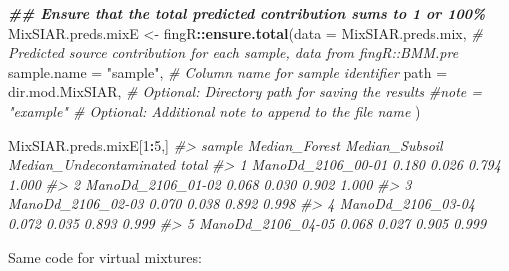 \documentclass[
]{article}
\newenvironment{Shaded}{\begin{snugshade}}{\end{snugshade}}
\newcommand{\AttributeTok}[1]{\textcolor[rgb]{0.13,0.29,0.53}{#1}}
\newcommand{\CommentTok}[1]{\textcolor[rgb]{0.56,0.35,0.01}{\textit{#1}}}
\newcommand{\DecValTok}[1]{\textcolor[rgb]{0.00,0.00,0.81}{#1}}
\newcommand{\DocumentationTok}[1]{\textcolor[rgb]{0.56,0.35,0.01}{\textbf{\textit{#1}}}}
\newcommand{\FunctionTok}[1]{\textcolor[rgb]{0.13,0.29,0.53}{\textbf{#1}}}
\newcommand{\NormalTok}[1]{#1}
\newcommand{\OtherTok}[1]{\textcolor[rgb]{0.56,0.35,0.01}{#1}}
\newcommand{\SpecialCharTok}[1]{\textcolor[rgb]{0.81,0.36,0.00}{\textbf{#1}}}
\newcommand{\StringTok}[1]{\textcolor[rgb]{0.31,0.60,0.02}{#1}}
\begin{document}
\begin{Shaded}
\begin{Highlighting}[]
\DocumentationTok{\#\# Ensure that the total predicted contribution sums to 1 or 100\%}
\NormalTok{MixSIAR.preds.mixE }\OtherTok{\textless{}{-}}\NormalTok{ fingR}\SpecialCharTok{::}\FunctionTok{ensure.total}\NormalTok{(}\AttributeTok{data =}\NormalTok{ MixSIAR.preds.mix,                  }\CommentTok{\# Predicted source contribution for each sample, data from fingR::BMM.pre}
                                          \AttributeTok{sample.name =} \StringTok{"sample"}\NormalTok{,                    }\CommentTok{\# Column name for sample identifier}
                                          \AttributeTok{path =}\NormalTok{ dir.mod.MixSIAR,                    }\CommentTok{\# Optional: Directory path for saving the results}
                                          \CommentTok{\#note = "example"                          \# Optional: Additional note to append to the file name}
\NormalTok{                                          )}
\end{Highlighting}
\end{Shaded}

\begin{Shaded}
\begin{Highlighting}[]
\NormalTok{MixSIAR.preds.mixE[}\DecValTok{1}\SpecialCharTok{:}\DecValTok{5}\NormalTok{,]}
\CommentTok{\#\textgreater{}              sample Median\_Forest Median\_Subsoil Median\_Undecontaminated total}
\CommentTok{\#\textgreater{} 1 ManoDd\_2106\_00{-}01         0.180          0.026                   0.794 1.000}
\CommentTok{\#\textgreater{} 2 ManoDd\_2106\_01{-}02         0.068          0.030                   0.902 1.000}
\CommentTok{\#\textgreater{} 3 ManoDd\_2106\_02{-}03         0.070          0.038                   0.892 0.998}
\CommentTok{\#\textgreater{} 4 ManoDd\_2106\_03{-}04         0.072          0.035                   0.893 0.999}
\CommentTok{\#\textgreater{} 5 ManoDd\_2106\_04{-}05         0.068          0.027                   0.905 0.999}
\end{Highlighting}
\end{Shaded}

Same code for virtual mixtures:
\end{document}
